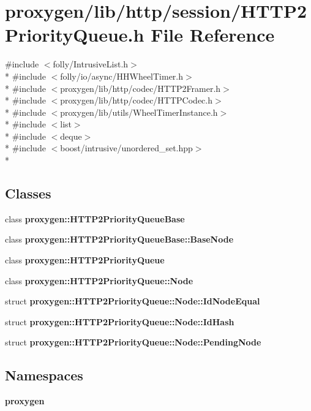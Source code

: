 \section{proxygen/lib/http/session/\+H\+T\+T\+P2\+Priority\+Queue.h File Reference}
\label{HTTP2PriorityQueue_8h}
{\ttfamily \#include $<$folly/\+Intrusive\+List.\+h$>$}\\*
{\ttfamily \#include $<$folly/io/async/\+H\+H\+Wheel\+Timer.\+h$>$}\\*
{\ttfamily \#include $<$proxygen/lib/http/codec/\+H\+T\+T\+P2\+Framer.\+h$>$}\\*
{\ttfamily \#include $<$proxygen/lib/http/codec/\+H\+T\+T\+P\+Codec.\+h$>$}\\*
{\ttfamily \#include $<$proxygen/lib/utils/\+Wheel\+Timer\+Instance.\+h$>$}\\*
{\ttfamily \#include $<$list$>$}\\*
{\ttfamily \#include $<$deque$>$}\\*
{\ttfamily \#include $<$boost/intrusive/unordered\+\_\+set.\+hpp$>$}\\*
\subsection*{Classes}
\begin{DoxyCompactItemize}
\item 
class {\bf proxygen\+::\+H\+T\+T\+P2\+Priority\+Queue\+Base}
\item 
class {\bf proxygen\+::\+H\+T\+T\+P2\+Priority\+Queue\+Base\+::\+Base\+Node}
\item 
class {\bf proxygen\+::\+H\+T\+T\+P2\+Priority\+Queue}
\item 
class {\bf proxygen\+::\+H\+T\+T\+P2\+Priority\+Queue\+::\+Node}
\item 
struct {\bf proxygen\+::\+H\+T\+T\+P2\+Priority\+Queue\+::\+Node\+::\+Id\+Node\+Equal}
\item 
struct {\bf proxygen\+::\+H\+T\+T\+P2\+Priority\+Queue\+::\+Node\+::\+Id\+Hash}
\item 
struct {\bf proxygen\+::\+H\+T\+T\+P2\+Priority\+Queue\+::\+Node\+::\+Pending\+Node}
\end{DoxyCompactItemize}
\subsection*{Namespaces}
\begin{DoxyCompactItemize}
\item 
 {\bf proxygen}
\end{DoxyCompactItemize}
